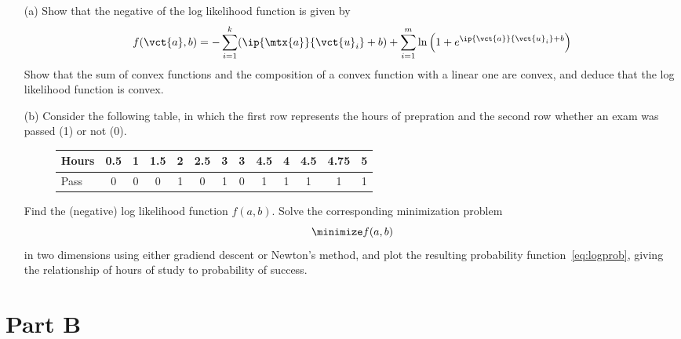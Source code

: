\documentclass{article}
\begin{document}
\begin{itemize}
 \item[(a)] Show that the negative of the log likelihood function is given by
\begin{equation*}
 f(\vct{a},b) = -\sum_{i=1}^k (\ip{\mtx{a}}{\vct{u}_i}+b)+\sum_{i=1}^m\ln\left(1+e^{\ip{\vct{a}}{\vct{u}_i}+b}\right)
 \end{equation*}
 Show that the sum of convex functions and the composition of a convex function with a linear one are convex, and deduce that the log likelihood function is convex.
 \item[(b)] Consider the following table, in which the first row represents the hours of prepration and the second row whether an exam was passed (1) or not (0).
 \begin{figure}[h!]
 \centering
 \begin{tabular}{l|c|c|c|c|c|c|c|c|c|c|c|c|}
  Hours & 0.5 & 1 & 1.5 & 2 & 2.5 & 3 & 3 & 4.5 & 4 &4.5 & 4.75 & 5 \\
  \hline
  Pass  & 0   & 0 & 0   & 1 & 0   & 1 & 0   & 1 & 1 & 1  & 1    & 1
 \end{tabular}
\end{figure}
Find the (negative) log likelihood function $f(a,b)$. Solve the corresponding minimization problem 
\begin{equation*}
 \minimize f(a,b)
\end{equation*}
in two dimensions using either gradiend descent or Newton's method, and plot the resulting probability function~\eqref{eq:logprob}, giving the relationship of hours of study to probability of success.
\end{itemize}

\section*{Part B}
\end{document}
